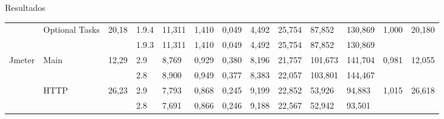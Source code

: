 \documentclass[t,14pt,mathserif]{beamer}
\begin{document}
\begin{frame}{Resultados}
\begin{table}[h]
{\begin{tabular}{|l|l|c|l|l|l|l|l|l|l|l|c|c|}
\multicolumn{1}{|c|}{}                     & \multirow{2}{*}{Optional Tasks}       & \multirow{2}{*}{20,18}     & 1.9.4                             & 11,311                         & 1,410                          & 0,049                          & 4,492                          & 25,754                         & 87,852                          & 130,869                         & \multirow{2}{*}{1,000} & \multirow{2}{*}{20,180} \\ \cline{4-11}
\multicolumn{1}{|c|}{}                     &                                       &                            & 1.9.3                             & 11,311                         & 1,410                          & 0,049                          & 4,492                          & 25,754                         & 87,852                          & 130,869                         &                        &                         \\ \hline
\multirow{4}{*}{Jmeter}                    & \multirow{2}{*}{Main}                 & \multirow{2}{*}{12,29}     & 2.9                               & 8,769                          & 0,929                          & 0,380                          & 8,196                          & 21,757                         & 101,673                         & 141,704                         & \multirow{2}{*}{0,981} & \multirow{2}{*}{12,055} \\ \cline{4-11}
                                           &                                       &                            & 2.8                               & 8,900                          & 0,949                          & 0,377                          & 8,383                          & 22,057                         & 103,801                         & 144,467                         &                        &                         \\ \cline{2-13} 
                                           & \multirow{2}{*}{HTTP}                 & \multirow{2}{*}{26,23}     & 2.9                               & 7,793                          & 0,868                          & 0,245                          & 9,199                          & 22,852                         & 53,926                          & 94,883                          & \multirow{2}{*}{1,015} & \multirow{2}{*}{26,618} \\ \cline{4-11}
                                           &                                       &                            & 2.8                               & 7,691                          & 0,866                          & 0,246                          & 9,188                          & 22,567                         & 52,942                          & 93,501                          &                        &                         \\ \hline

\end{tabular}}
\end{table}
\end{frame}
\end{document}
